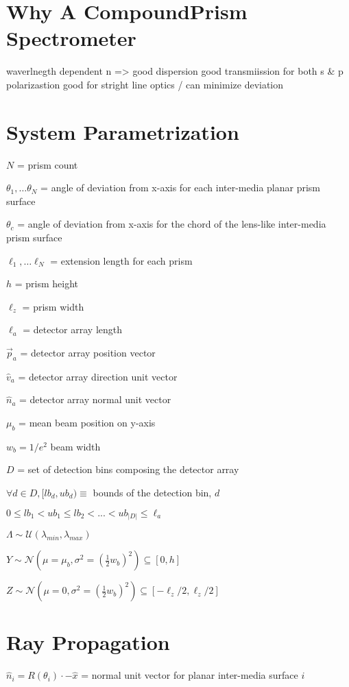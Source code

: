 \documentclass{article}
\begin{document}
\section{Why A CompoundPrism Spectrometer}\label{sec:why-a-compoundprism-spectrometer}
waverlnegth dependent n => good dispersion
good transmiission for both s & p polarizastion
good for stright line optics / can minimize deviation

\section{System Parametrization}\label{sec:system-parametrization}
$N$ = prism count

${\theta_1, \dots \theta_N }$ =  angle of deviation from x-axis for each inter-media planar prism surface

$\theta_c$ =  angle of deviation from x-axis for the chord of the lens-like inter-media prism surface

${\ell_1, \dots \ell_N }$ = extension length for each prism

$h$ = prism height

$\ell_z$  = prism width

$\ell_a$  = detector array length

$\vec{p}_a$ = detector array position vector

$\hat{v}_a$ = detector array direction unit vector

$\hat{n}_a$ = detector array normal unit vector

$\mu_b$ = mean beam position on y-axis

$w_b = 1 / e^2$ {beam width}

$D$ = set of detection bins composing the detector array

$\forall d \in D, [lb_d, ub_d) \equiv$ bounds of the detection bin, $d$

$0 \leq lb_1 < ub_1 \leq lb_2 < ... < ub_{|D|} \leq \ell_a $

$\Lambda \sim \mathcal{U}(\lambda_{min}, \lambda_{max}) $

$Y \sim \mathcal {N}(\mu=\mu_b, \sigma^2=(\frac{1}{2}w_b)^2) \subseteq [0, h] $

$Z \sim \mathcal {N}(\mu=0, \sigma^2=(\frac{1}{2}w_b)^2) \subseteq [-\ell_z / 2, \ell_z / 2]$

\section{Ray Propagation}\label{sec:ray-propagation}
$\hat{n}_i = R(\theta_i) \cdot -\hat{x}$ = normal unit vector for planar inter-media surface $i$
\end{document}

